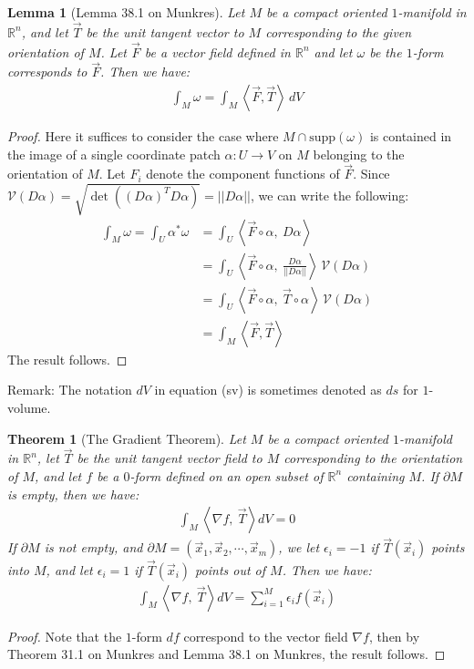 \documentclass[15pt]{book}
\theoremstyle{break}
\theoremstyle{break}
\newtheorem{thm}{Theorem}[section]
\newtheorem{lem}{Lemma}[thm]
\newcommand{\R}{\mathbb{R}}
\newcommand{\supp}{\text{supp}}
\newcommand{\remark}{\color{blue}Remark: \color{black}}
\begin{document}
\begin{lem}[Lemma 38.1 on Munkres]
Let $M$ be a compact oriented $1$-manifold in $\R^n$, and let $\vec{T}$ be the unit tangent vector to $M$ corresponding to the given orientation of $M$. Let $\vec{F}$ be a vector field defined in $\R^n$ and let $\omega$ be the $1$-form corresponds to $\vec{F}$. Then we have:
\begin{align*}
\int_M \omega = \int_M \left< \vec{F}, \vec{T}\right> \, dV \tag{sv}
\end{align*} 
\end{lem}
\begin{proof}
Here it suffices to consider the case where $M\cap \supp(\omega)$ is contained in the image of a single coordinate patch $\alpha:U \to V$ on $M$ belonging to the orientation of $M$. Let $F_i$ denote the component functions of $\vec{F}$. Since $\mathcal{V}(D\alpha) = \sqrt{\det((D\alpha)^T D\alpha)} = ||D\alpha||$, we can write the following:
\begin{align*}
\int_M \omega = \int_U \alpha^*\omega &= \int_U \left< \vec{F} \circ \alpha, \ D\alpha\right> \\
&= \int_U \left< \vec{F}\circ \alpha,\ \frac{D\alpha}{||D\alpha||} \right> \,\mathcal{V}(D\alpha)\\
&= \int_U \left< \vec{F}\circ \alpha,\ \vec{T}\circ \alpha \right> \,\mathcal{V}(D\alpha)\\
&= \int_M \left< \vec{F}, \vec{T}\right>
\end{align*}
The result follows.
\end{proof}

\remark The notation $dV$ in equation (sv) is sometimes denoted as $ds$ for $1$-volume. \\

\begin{thm}[The Gradient Theorem]
Let $M$ be a compact oriented $1$-manifold in $\R^n$, let $\vec{T}$ be the unit tangent vector field to $M$ corresponding to the orientation of $M$, and let $f$ be a $0$-form defined on an open subset of $\R^n$ containing $M$. If $\partial M$ is empty, then we have:
\begin{align*}
 \int_M \left< \nabla f,\ \vec{T}\right> dV = 0
\end{align*}
If $\partial M$ is not empty, and $\partial M = (\vec{x}_1,\vec{x}_2,\cdots, \vec{x}_m)$, we let $\epsilon_i = -1$ if $\vec{T}(\vec{x}_i)$ points into $M$,  and let $\epsilon_i = 1$ if $\vec{T}(\vec{x}_i)$ points out of $M$. Then we have:
\begin{align*}
 \int_M \left< \nabla f,\ \vec{T}\right> dV =  \sum_{i=1}^M \epsilon_i f(\vec{x}_i) 
\end{align*}
\end{thm}
\begin{proof}
Note that the $1$-form $df$ correspond to the vector field $\nabla f$, then by Theorem 31.1 on Munkres and Lemma 38.1 on Munkres, the result follows.
\end{proof}
\end{document}
